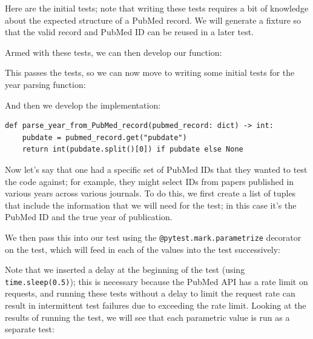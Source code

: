 Here are the initial tests; note that writing these tests requires a bit of knowledge about the expected structure of a PubMed record.
We will generate a fixture so that the valid record and PubMed ID can be reused in a later test.




Armed with these tests, we can then develop our function:



This passes the tests, so we can now move to writing some initial tests for the year parsing function:



And then we develop the implementation:

\begin{lstlisting}[style=Pythonshort]
def parse_year_from_PubMed_record(pubmed_record: dict) -> int:
    pubdate = pubmed_record.get("pubdate") 
    return int(pubdate.split()[0]) if pubdate else None
\end{lstlisting}

Now let's say that one had a specific set of PubMed IDs that they wanted to test the code against; for example, they might select IDs from papers published in various years across various journals.
To do this, we first create a list of tuples that include the information that we will need for the test; in this case it's the PubMed ID and the true year of publication.



We then pass this into our test using the \texttt{@pytest.mark.parametrize} decorator on the test, which will feed in each of the values into the test successively:



Note that we inserted a delay at the beginning of the test (using \texttt{time.sleep(0.5)}); this is necessary because the PubMed API has a rate limit on requests, and running these tests without a delay to limit the request rate can result in intermittent test failures due to exceeding the rate limit.
Looking at the results of running the test, we will see that each parametric value is run as a separate test:

